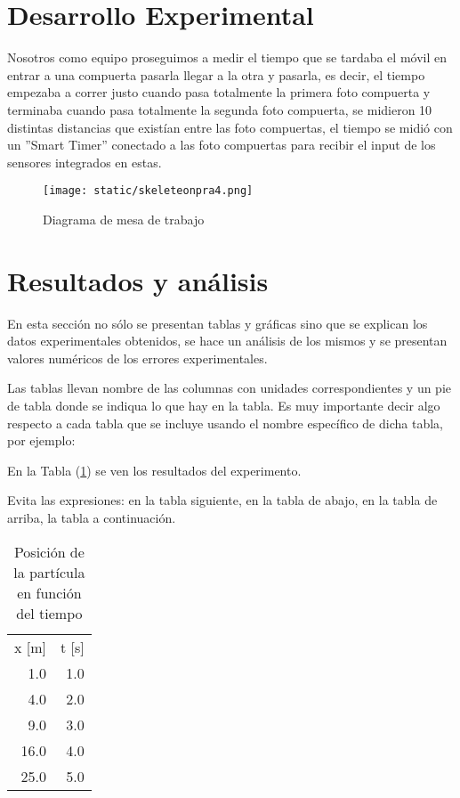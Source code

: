 \documentclass{article}
\begin{document}
\begin{multicols}{2}
\section*{Desarrollo Experimental}\label{Desarrollo experimental}				%

Nosotros como equipo proseguimos a medir el tiempo que se tardaba el móvil en entrar a una compuerta pasarla llegar a la otra y pasarla, es decir, el tiempo empezaba a correr justo cuando pasa totalmente la primera foto compuerta y terminaba cuando pasa totalmente la segunda foto compuerta, se midieron 10 distintas distancias que existían entre las foto compuertas, el tiempo se midió con un ”Smart Timer” conectado a las foto compuertas para recibir el input de los sensores integrados en estas.

\begin{figure}[H]
	\centering
	\texttt{[image: static/skeleteonpra4.png]}
	\caption{Diagrama de mesa de trabajo}
	\label{fig:1}
\end{figure}

\section*{Resultados y análisis}\label{Resultados}			%

En esta sección no sólo se presentan tablas y gráficas sino que se explican los datos experimentales obtenidos, se hace un análisis de los mismos y se presentan valores numéricos de los errores experimentales. 

Las tablas llevan nombre de las columnas con unidades correspondientes y un pie de tabla donde se indiqua lo que hay en la tabla. Es muy importante decir algo respecto a cada tabla que se incluye usando el nombre específico de dicha tabla, por ejemplo:

En la Tabla (\ref{Tabla:1}) se ven los resultados del experimento.

Evita las expresiones: en la tabla siguiente, en la tabla de abajo, en la tabla de arriba, la tabla a continuación.
%
\begin{table}[H]
	\centering
	\begin{tabular}{ | r | r | }
	\hline
		x [m]		&	t [s] 			\\%
		1.0		&	1.0			\\
		4.0		&	2.0			\\
		9.0		&	3.0			\\
		16.0		&	4.0			\\
		25.0		&	5.0			\\
	\hline
	\end{tabular}
	\caption{Posici\'on de la partícula en funci\'on del tiempo}
	\label{Tabla:1}
\end{table}


\end{multicols}
\end{document}
